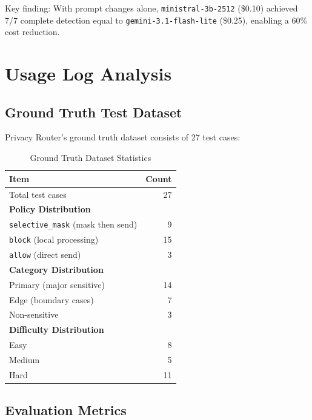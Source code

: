 \documentclass[11pt,a4paper]{article}
\begin{document}
Key finding: With prompt changes alone, \texttt{ministral-3b-2512} (\$0.10) achieved 7/7 complete detection equal to \texttt{gemini-3.1-flash-lite} (\$0.25), enabling a 60\% cost reduction.

\section{Usage Log Analysis}

\subsection{Ground Truth Test Dataset}

Privacy Router's ground truth dataset consists of 27 test cases:

\begin{table}[h]
\centering
\begin{tabular}{@{}lr@{}}
\toprule
Item & Count \\
\midrule
Total test cases & 27 \\
\midrule
\multicolumn{2}{l}{\textbf{Policy Distribution}} \\
\quad \texttt{selective\_mask} (mask then send) & 9 \\
\quad \texttt{block} (local processing) & 15 \\
\quad \texttt{allow} (direct send) & 3 \\
\midrule
\multicolumn{2}{l}{\textbf{Category Distribution}} \\
\quad Primary (major sensitive) & 14 \\
\quad Edge (boundary cases) & 7 \\
\quad Non-sensitive & 3 \\
\midrule
\multicolumn{2}{l}{\textbf{Difficulty Distribution}} \\
\quad Easy & 8 \\
\quad Medium & 5 \\
\quad Hard & 11 \\
\bottomrule
\end{tabular}
\caption{Ground Truth Dataset Statistics}
\end{table}

\subsection{Evaluation Metrics}
\end{document}
